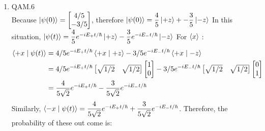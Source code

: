 \documentclass{article}
\providecommand{\Matrix}[1] {\begin{bmatrix} #1 \end{bmatrix}}
\theoremstyle{definition}
\theoremstyle{plain}
\begin{document}
\begin {enumerate}[itemindent=30pt,label=\bf Exercise {\arabic*}:]
\begin{align*}
	\Braket{S_{y}} &= \dfrac{\hbar}{2}(\dfrac{1}{2} + \dfrac{1}{2} sin(\omega t)) - \dfrac{\hbar}{2}(\dfrac{1}{2} - \dfrac{1}{2} sin(\omega t))\\
	&= \dfrac{\hbar}{2} sin(\omega t)
\end{align*}
\subitem for $\Braket{S_{z}}$:
\begin{align*}
	\Braket{+z \mid \psi(t)} &= \sqrt{1/2} e^{-iE_{+}t/\hbar}\Braket{+z \mid +z} + \sqrt{1/2} e^{-iE_{-}t/\hbar}\Braket{+z \mid -z}\\
	&=\sqrt{1/2} e^{-iE_{+}t/\hbar}\\
	\Braket{-z \mid \psi(t)} &= \sqrt{1/2} e^{-iE_{+}t/\hbar}\Braket{-z \mid +z} + \sqrt{1/2} e^{-iE_{-}t/\hbar}\Braket{-z \mid -z}\\
	&=\sqrt{1/2} e^{-iE_{-}t/\hbar}
\end{align*}
\subitem Therefore, we can get the expectation value of $S_{z}$:
\begin{align*}
	\Braket{S_{z}} &= \dfrac{\hbar}{2} |\Braket{+z\mid \psi}|^2 - \dfrac{\hbar}{2} |\Braket{-z \mid \psi}|^2\\
	&=\dfrac{\hbar}{2}
\end{align*}
\subitem According to the calculation, we know that the $\Braket{S_{z}}$ is a constant  and $\Braket{S_x}$ and $\Braket{S_y}$ are functions depend on time. We can easily find that S is rotating about z axis on the xy plane. This motion is what we expect in classic model. So this result make sense. 
\item QAM.6\\
\subitem Because $\Ket{\psi(0)} = \Matrix{4/5 \\ -3/5}$, therefore  $\ket{\psi(0)} = \dfrac{4}{5}\Ket{+z} + -\dfrac{3}{5}\Ket{-z}$
\subitem In this situation, $\ket{\psi(t)} = \dfrac{4}{5} e^{-iE_{+}t/\hbar}\Ket{+z} - \dfrac{3}{5} e^{-iE_{-}t/\hbar}\Ket{-z}$
\subitem For $\Braket{x}$ :
\begin{align*}
	\Braket{+x \mid \psi(t)} &= 4/5 e^{-iE_{+}t/\hbar}\Braket{+x \mid +z} - 3/5 e^{-iE_{-}t/\hbar}\Braket{+x \mid -z}\\
	&= 4/5 e^{-iE_{+}t/\hbar}\Matrix{\sqrt{1/2} & \sqrt{1/2}} \Matrix{1 \\ 0} - 3/5 e^{-iE_{-}t/\hbar}\Matrix{\sqrt{1/2} & \sqrt{1/2}} \Matrix{0 \\ 1}\\
	&= \dfrac{4}{5\sqrt{2}} e^{-iE_{+}t/\hbar}- \dfrac{3}{5\sqrt{2}} e^{-iE_{-}t/\hbar}
\end{align*}
\subitem Similarly, $\Braket{-x \mid \psi(t)} = \dfrac{4}{5\sqrt{2}} e^{-iE_{+}t/\hbar} + \dfrac{3}{5\sqrt{2}} e^{-iE_{-}t/\hbar}$. Therefore, the probability of these out come is:

\end{enumerate}
\end{document}
